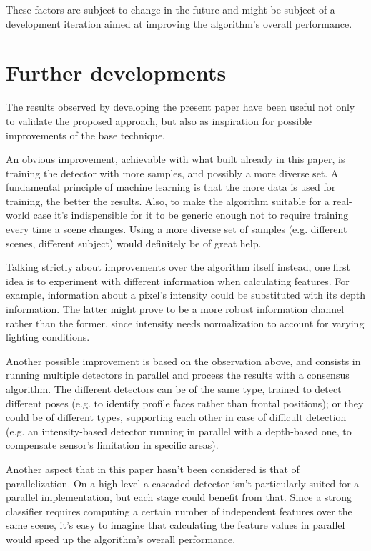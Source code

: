 \documentclass[a4paper,11pt,titlepage]{article}
\begin{document}
These factors are subject to change in the future and might be subject of a
development iteration aimed at improving the algorithm's overall performance.

\section{Further developments}
The results observed by developing the present paper have been useful not only to
validate the proposed approach, but also as inspiration for possible
improvements of the base technique.

An obvious improvement, achievable with what built already in this paper, is
training the detector with more samples, and possibly a more diverse set. A
fundamental principle of machine learning is that the more data is used for
training, the better the results. Also, to make the algorithm suitable for a
real-world case it's indispensible for it to be generic enough not to require
training every time a scene changes. Using a more diverse set of samples (e.g.
different scenes, different subject) would definitely be of great help.

Talking strictly about improvements over the algorithm itself instead, one first
idea is to experiment with different information when calculating features. For
example, information about a pixel's intensity could be substituted with its
depth information. The latter might prove to be a more robust information
channel rather than the former, since intensity needs normalization to account
for varying lighting conditions.

Another possible improvement is based on the observation above, and consists in
running multiple detectors in parallel and process the results with a consensus
algorithm. The different detectors can be of the same type, trained to detect
different poses (e.g. to identify profile faces rather than frontal positions);
or they could be of different types, supporting each other in case of difficult
detection (e.g. an intensity-based detector running in parallel with a
depth-based one, to compensate sensor's limitation in specific areas).

Another aspect that in this paper hasn't been considered is that of
parallelization. On a high level a cascaded detector isn't particularly suited
for a parallel implementation, but each stage could benefit from that. Since a
strong classifier requires computing a certain number of independent features
over the same scene, it's easy to imagine that calculating the feature values in
parallel would speed up the algorithm's overall performance.
\end{document}
